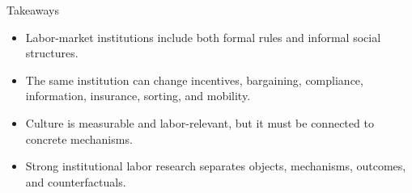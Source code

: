 \documentclass[aspectratio=169,11pt]{beamer}
\begin{document}
\begin{frame}{Takeaways}
\begin{itemize}
    \item Labor-market institutions include both formal rules and informal social structures.
    \item The same institution can change incentives, bargaining, compliance, information, insurance, sorting, and mobility.
    \item Culture is measurable and labor-relevant, but it must be connected to concrete mechanisms.
    \item Strong institutional labor research separates objects, mechanisms, outcomes, and counterfactuals.
\end{itemize}
\end{frame}
\end{document}
